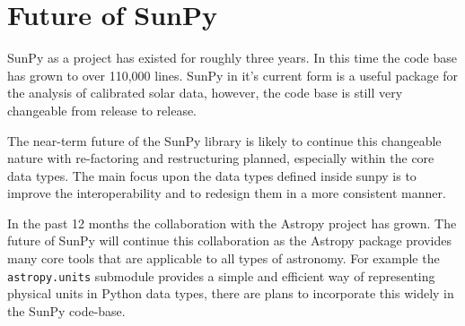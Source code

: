 \section{Future of SunPy}
SunPy as a project has existed for roughly three years. In this time the code 
base has grown to over 110,000 lines. SunPy in it's current form is a useful 
package for the analysis of calibrated solar data, however, the code base is 
still very changeable from release to release.

The near-term future of the SunPy library is likely to continue this changeable 
nature with re-factoring and restructuring planned, especially within the 
core data types. The main focus upon the data types defined inside sunpy is to 
improve the interoperability and to redesign them in a more consistent manner.

In the past 12 months the collaboration with the Astropy project 
\cite{theastropycollaboration2013} has grown. The future of SunPy 
will continue this collaboration as the Astropy package provides many core 
tools that are applicable to all types of astronomy. For example the 
\texttt{astropy.units} submodule provides a simple and efficient way of 
representing physical units in Python data types, there are plans to 
incorporate this widely in the SunPy code-base.